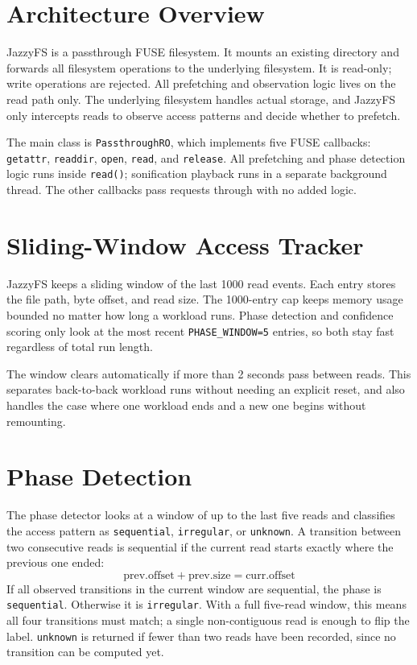 \documentclass[12pt]{report}
\begin{document}
\section{Architecture Overview}
\label{sec:design-arch}

JazzyFS is a passthrough FUSE filesystem. It mounts an existing directory
and forwards all filesystem operations to the underlying filesystem. It is
read-only; write operations are rejected. All prefetching and observation
logic lives on the read path only. The underlying filesystem handles actual
storage, and JazzyFS only intercepts reads to observe access patterns and
decide whether to prefetch.

The main class is \texttt{PassthroughRO}, which implements five FUSE
callbacks: \texttt{getattr}, \texttt{readdir}, \texttt{open}, \texttt{read},
and \texttt{release}. All prefetching and phase detection logic runs inside \texttt{read()}; sonification playback runs in a separate background thread.
The other callbacks pass requests through with no added logic.

\section{Sliding-Window Access Tracker}
\label{sec:design-window}

JazzyFS keeps a sliding window of the last 1000 read events. Each entry
stores the file path, byte offset, and read size. The 1000-entry cap keeps
memory usage bounded no matter how long a workload runs. Phase detection
and confidence scoring only look at the most recent \texttt{PHASE\_WINDOW=5}
entries, so both stay fast regardless of total run length.

The window clears automatically if more than 2 seconds pass between reads.
This separates back-to-back workload runs without needing an explicit reset,
and also handles the case where one workload ends and a new one begins
without remounting.

\section{Phase Detection}
\label{sec:design-phase}

The phase detector looks at a window of up to the last five reads and classifies
the access pattern as \texttt{sequential}, \texttt{irregular}, or \texttt{unknown}.
A transition between two consecutive reads is sequential if the current
read starts exactly where the previous one ended:
\[
\text{prev.offset} + \text{prev.size} = \text{curr.offset}
\]
If all observed transitions in the current window are sequential, the phase is
\texttt{sequential}. Otherwise it is \texttt{irregular}. With a full five-read
window, this means all four transitions must match; a single non-contiguous
read is enough to flip the label. \texttt{unknown} is returned if fewer than two reads have been recorded,
since no transition can be computed yet.
\end{document}
